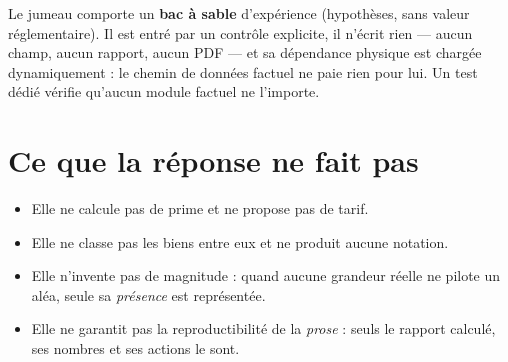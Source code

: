 \begin{encadre}[title={Un mode explicitement séparé}]
Le jumeau comporte un \textbf{bac à sable} d'expérience (hypothèses, sans valeur
réglementaire). Il est entré par un contrôle explicite, il n'écrit rien — aucun
champ, aucun rapport, aucun PDF — et sa dépendance physique est chargée
dynamiquement : le chemin de données factuel ne paie rien pour lui. Un test dédié
vérifie qu'aucun module factuel ne l'importe.
\end{encadre}

\section{Ce que la réponse ne fait pas}

\begin{itemize}
  \item Elle ne calcule pas de prime et ne propose pas de tarif.
  \item Elle ne classe pas les biens entre eux et ne produit aucune notation.
  \item Elle n'invente pas de magnitude : quand aucune grandeur réelle ne pilote
    un aléa, seule sa \emph{présence} est représentée.
  \item Elle ne garantit pas la reproductibilité de la \emph{prose} : seuls le
    rapport calculé, ses nombres et ses actions le sont.
\end{itemize}
